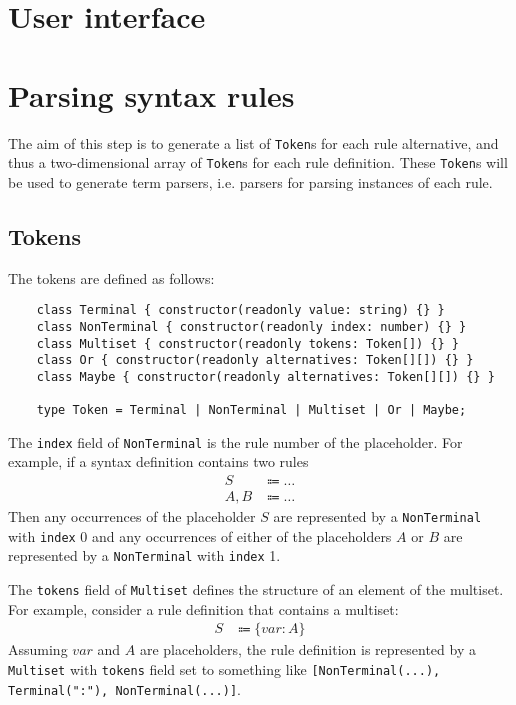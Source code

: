 \section{User interface}

\section{Parsing syntax rules}
The aim of this step is to generate a list of \lstinline{Token}s for each rule alternative, and thus a two-dimensional array of \lstinline{Token}s for each rule definition. These \lstinline{Token}s will be used to generate term parsers, i.e. parsers for parsing instances of each rule.

\subsection{Tokens}
The tokens are defined as follows:
\begin{lstlisting}
    class Terminal { constructor(readonly value: string) {} }
    class NonTerminal { constructor(readonly index: number) {} }
    class Multiset { constructor(readonly tokens: Token[]) {} }
    class Or { constructor(readonly alternatives: Token[][]) {} }
    class Maybe { constructor(readonly alternatives: Token[][]) {} }

    type Token = Terminal | NonTerminal | Multiset | Or | Maybe;
\end{lstlisting}
The \lstinline{index} field of \lstinline{NonTerminal} is the rule number of the placeholder. For example, if a syntax definition contains two rules
\begin{align*}
    S &\Coloneqq \ldots \\
    A, B &\Coloneqq \ldots
\end{align*}
Then any occurrences of the placeholder $S$ are represented by a \lstinline{NonTerminal} with \lstinline{index} 0 and any occurrences of either of the placeholders $A$ or $B$ are represented by a \lstinline{NonTerminal} with \lstinline{index} 1.

The \lstinline{tokens} field of \lstinline{Multiset} defines the structure of an element of the multiset. For example, consider a rule definition that contains a multiset:
\begin{align*}
    S &\Coloneqq \{ var: A \}
\end{align*}
Assuming $var$ and $A$ are placeholders, the rule definition is represented by a \lstinline{Multiset} with \lstinline{tokens} field set to something like \lstinline{[NonTerminal(...), Terminal(":"), NonTerminal(...)]}.

